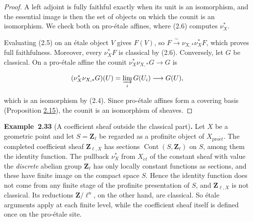 \documentclass[11pt]{article}
\newenvironment{bpstatement}[2]{\par\addvspace{0.6\baselineskip}\noindent\textbf{#1}#2\textbf{.}\enspace\ignorespaces}
  {\par\addvspace{0.4\baselineskip}}
\begin{document}
\begin{proof}[{Proof}]\label{bp96}%
A left adjoint is fully faithful exactly when its unit is an isomorphism, and the essential image is then the set of objects on which the counit is an isomorphism. We check both on pro-étale affines, where (2.6) computes \(\nu_X^*\).

Evaluating (2.5) on an étale object \(V\) gives \(F(V)\), so \(F\xrightarrow{\sim}\nu_{X,*}\nu_X^*F\), which proves full faithfulness. Moreover, every \(\nu_X^*F\) is classical by (2.6). Conversely, let \(G\) be classical. On a pro-étale affine the counit \(\nu_X^*\nu_{X,*}G\to G\) is

\[
(\nu_X^*\nu_{X,*}G)(U)
=\varinjlim_iG(U_i)\longrightarrow G(U),
\]

which is an isomorphism by (2.4). Since pro-étale affines form a covering basis (Proposition \hyperref[bp46]{2.15}), the counit is an isomorphism of sheaves.
\end{proof}

\label{bp97}%
\begin{bpstatement}{Example~2.33}{ (A coefficient sheaf outside the classical part)}
Let \(X\) be a geometric point and let \(S=\mathbf Z_\ell\) be regarded as a profinite object of \(X_{\mathrm{pro}\acute{e}t}\). The completed coefficient sheaf \(\mathbf Z_{\ell,X}\) has sections \(\operatorname{Cont}(S,\mathbf Z_\ell)\) on \(S\), among them the identity function. The pullback \(\nu_X^*\) from \(X_{\acute{e}t}\) of the constant sheaf with value the \emph{discrete} abelian group \(\mathbf Z_\ell\) has only locally constant functions as sections, and these have finite image on the compact space \(S\). Hence the identity function does not come from any finite stage of the profinite presentation of \(S\), and \(\mathbf Z_{\ell,X}\) is not classical. Its reductions \(\mathbf Z/\ell^n\), on the other hand, are classical. So étale arguments apply at each finite level, while the coefficient sheaf itself is defined once on the pro-étale site.
\end{bpstatement}


\end{document}
